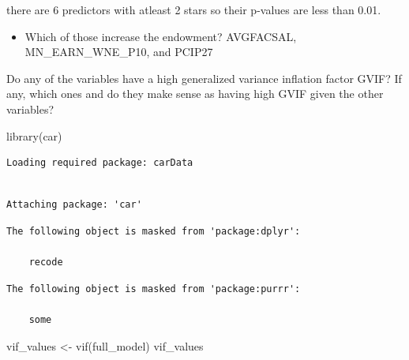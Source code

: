 \documentclass[
  letterpaper,
  DIV=11,
  numbers=noendperiod]{scrartcl}
\newenvironment{Shaded}{\begin{snugshade}}{\end{snugshade}}
\newcommand{\FunctionTok}[1]{\textcolor[rgb]{0.28,0.35,0.67}{#1}}
\newcommand{\NormalTok}[1]{\textcolor[rgb]{0.00,0.23,0.31}{#1}}
\newcommand{\OtherTok}[1]{\textcolor[rgb]{0.00,0.23,0.31}{#1}}
\providecommand{\tightlist}{%
  \setlength{\itemsep}{0pt}\setlength{\parskip}{0pt}}\usepackage{longtable,booktabs,array}
\begin{document}
there are 6 predictors with atleast 2 stars so their p-values are less
than 0.01.

\begin{itemize}
\tightlist
\item
  Which of those increase the endowment? AVGFACSAL, MN\_EARN\_WNE\_P10,
  and PCIP27
\end{itemize}

Do any of the variables have a high generalized variance inflation
factor GVIF? If any, which ones and do they make sense as having high
GVIF given the other variables?

\begin{Shaded}
\begin{Highlighting}[]
\FunctionTok{library}\NormalTok{(car)}
\end{Highlighting}
\end{Shaded}

\begin{verbatim}
Loading required package: carData
\end{verbatim}

\begin{verbatim}

Attaching package: 'car'
\end{verbatim}

\begin{verbatim}
The following object is masked from 'package:dplyr':

    recode
\end{verbatim}

\begin{verbatim}
The following object is masked from 'package:purrr':

    some
\end{verbatim}

\begin{Shaded}
\begin{Highlighting}[]
\NormalTok{vif\_values }\OtherTok{\textless{}{-}} \FunctionTok{vif}\NormalTok{(full\_model)}
\NormalTok{vif\_values}
\end{Highlighting}
\end{Shaded}
\end{document}
